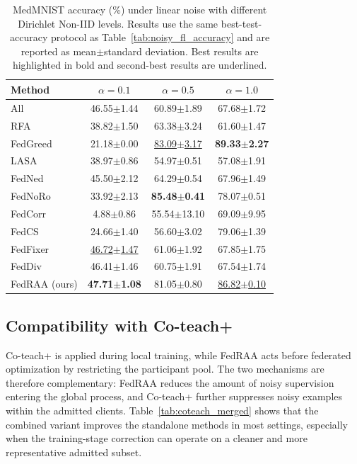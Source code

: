 \documentclass[conference]{IEEEtran}
\theoremstyle{definition}
\theoremstyle{remark}
\begin{document}
\begin{table}[t]
\centering
\caption{MedMNIST accuracy (\%) under linear noise with different Dirichlet Non-IID levels. Results use the same best-test-accuracy protocol as Table~\ref{tab:noisy_fl_accuracy} and are reported as mean$\pm$standard deviation. Best results are highlighted in bold and second-best results are underlined.}
\label{tab:medmnist_noniid_appendix}
\setlength{\tabcolsep}{5pt}
\renewcommand{\arraystretch}{1.10}
\begin{tabular}{lccc}
\toprule
\textbf{Method} & $\alpha=0.1$ & $\alpha=0.5$ & $\alpha=1.0$ \\
\midrule
All & 46.55$\pm$1.44 & 60.89$\pm$1.89 & 67.68$\pm$1.72 \\
RFA~\cite{pillutla2022robust} & 38.82$\pm$1.50 & 63.38$\pm$3.24 & 61.60$\pm$1.47 \\
FedGreed~\cite{kritharakis2025fedgreed} & 21.18$\pm$0.00 & \underline{83.09$\pm$3.17} & \textbf{89.33$\pm$2.27} \\
LASA~\cite{xu2025lasa} & 38.97$\pm$0.86 & 54.97$\pm$0.51 & 57.08$\pm$1.91 \\
FedNed~\cite{lu2024fedned} & 45.50$\pm$2.12 & 64.29$\pm$0.54 & 67.96$\pm$1.49 \\
FedNoRo~\cite{wu2023fednoro} & 33.92$\pm$2.13 & \textbf{85.48$\pm$0.41} & 78.07$\pm$0.51 \\
FedCorr~\cite{xu2022fedcorr} & 4.88$\pm$0.86 & 55.54$\pm$13.10 & 69.09$\pm$9.95 \\
FedCS~\cite{hao2025fedcs} & 24.66$\pm$1.40 & 56.60$\pm$3.02 & 79.06$\pm$1.39 \\
FedFixer~\cite{ji2024fedfixer} & \underline{46.72$\pm$1.47} & 61.06$\pm$1.92 & 67.85$\pm$1.75 \\
FedDiv~\cite{li2024feddiv} & 46.41$\pm$1.46 & 60.75$\pm$1.91 & 67.54$\pm$1.74 \\
\midrule
FedRAA (ours) & \textbf{47.71$\pm$1.08} & 81.05$\pm$0.80 & \underline{86.82$\pm$0.10} \\
\bottomrule
\end{tabular}
\end{table}

\subsection{Compatibility with Co-teach+}

Co-teach+ is applied during local training, while FedRAA acts before federated optimization by restricting the participant pool.
The two mechanisms are therefore complementary: FedRAA reduces the amount of noisy supervision entering the global process, and Co-teach+ further suppresses noisy examples within the admitted clients.
Table~\ref{tab:coteach_merged} shows that the combined variant improves the standalone methods in most settings, especially when the training-stage correction can operate on a cleaner and more representative admitted subset.
\end{document}
